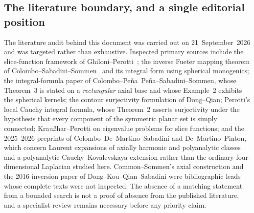 \documentclass[11pt,a4paper]{article}
\numberwithin{equation}{section}
\theoremstyle{definition}
\theoremstyle{remark}
\theoremstyle{plain}
\begin{document}
\subsection{The literature boundary, and a single editorial position}
\label{f:sub:literature}

The literature audit behind this document was carried out on
21~September~2026 and was targeted rather than exhaustive. Inspected
primary sources include the slice-function framework of Ghiloni--Perotti~\cite{GP};
the inverse Fueter mapping theorem of Colombo--Sabadini--Sommen~\cite{CSS} and its
integral form using spherical monogenics; the integral-formula paper of
Colombo--Pe\~na~Pe\~na--Sabadini--Sommen, whose Theorem~3 is stated on a
\emph{rectangular} axial base and whose Example~2 exhibits the spherical
kernels; the contour surjectivity formulation of Dong--Qian; Perotti's
local Cauchy integral formula, whose Theorem~2 asserts surjectivity under
the hypothesis that every component of the symmetric planar set is simply
connected; Krau\ss har--Perotti on eigenvalue problems for slice functions;
and the 2025--2026 preprints of Colombo--De~Martino--Sabadini and
De~Martino--Pinton, which concern Laurent expansions of axially harmonic
and polyanalytic classes and a polyanalytic Cauchy--Kovalevskaya extension
rather than the ordinary four-dimensional Laplacian studied here.
Common--Sommen's axial construction and the 2016 inversion paper of
Dong--Kou--Qian--Sabadini were bibliographic leads whose complete texts
were not inspected. The absence of a matching statement from a bounded
search is not a proof of absence from the published literature, and a
specialist review remains necessary before any priority claim.
\end{document}

